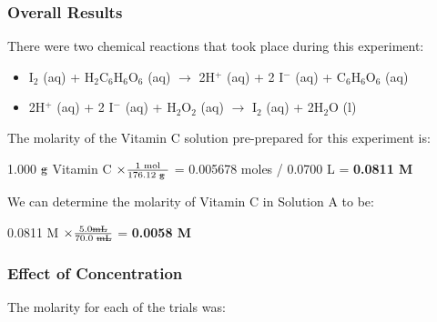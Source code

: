 \documentclass[11pt]{article}
\begin{document}
\subsubsection{Overall Results}
There were two chemical reactions that took place during this experiment:
\begin{itemize}
\item I$_{2}$ (aq) +  H$_{2}$C$_{6}$H$_{6}$O$_{6}$ (aq)  $\rightarrow$ 2H$^{+}$ (aq) + 2 I$^{-}$ (aq) + C$_{6}$H$_{6}$O$_{6}$ (aq)
\item 2H$^{+}$ (aq) + 2 I$^{-}$ (aq) + H$_{2}$O$_{2}$ (aq) $\rightarrow$ I$_{2}$ (aq) + 2H$_{2}$O (l)
\end{itemize}
The molarity of the Vitamin C solution pre-prepared for this experiment is:

	1.000 $\textrm{\sout{g}}$ Vitamin C $\times \frac{\textrm{1 mol}}{\textrm{176.12 \sout{g} } }$ = 0.005678 moles / 0.0700 L = \textbf{0.0811 M}
	
We can determine the molarity of Vitamin C in Solution A to be:

0.0811 M $\times \frac{\textrm{5.0\sout{mL}}}{\textrm{70.0 \sout{mL}}}$ = \textbf{0.0058 M}
	
\subsubsection{Effect of Concentration}
The molarity for each of the trials was:
\end{document}
